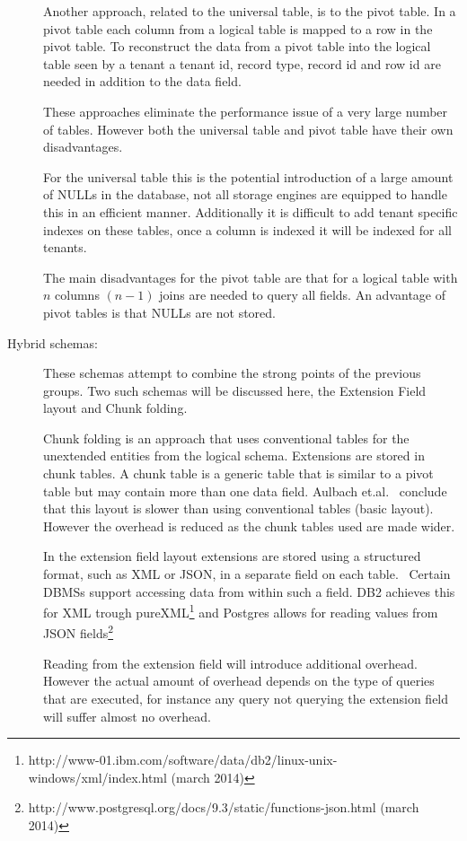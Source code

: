 \begin{description}
		Another approach, related to the universal table, is to the pivot table. 
		In a pivot table each column from a logical table is mapped to a row in the pivot table.
		To reconstruct the data from a pivot table into the logical table seen by a tenant a tenant id, record type, record id and row id are needed in addition to the data field.~\cite{aulbach2008multi}

		These approaches eliminate the performance issue of a very large number of tables.
		However both the universal table and pivot table have their own disadvantages. 

		For the universal table this is the potential introduction of a large amount of NULLs in the database, not all storage engines are equipped to handle this in an efficient manner. 
		Additionally it is difficult to add tenant specific indexes on these tables, once a column is indexed it will be indexed for all tenants.

		The main disadvantages for the pivot table are that for a logical table with $n$ columns $(n-1)$ joins are needed to query all fields. 
		An advantage of pivot tables is that NULLs are not stored.
	\item[Hybrid schemas: ] These schemas attempt to combine the strong points of the previous groups. 
		Two such schemas will be discussed here, the Extension Field layout and Chunk folding.

		Chunk folding is an approach that uses conventional tables for the unextended entities from the logical schema.
		Extensions are stored in chunk tables. A chunk table is a generic table that is similar to a pivot table but may contain more than one data field.
		Aulbach et.al.~\cite{aulbach2008multi} conclude that this layout is slower than using conventional tables (basic layout). 
		However the overhead is reduced as the chunk tables used are made wider. 

		In the extension field layout extensions are stored using a structured format, such as XML or JSON, in a separate field on each table.~\cite{aulbach2009comparison}
		Certain \acp{DBMS} support accessing data from within such a field. DB2 achieves this for XML trough pureXML\footnote{http://www-01.ibm.com/software/data/db2/linux-unix-windows/xml/index.html (march 2014)} and Postgres allows for reading values from JSON fields\footnote{http://www.postgresql.org/docs/9.3/static/functions-json.html (march 2014)}
		
		Reading from the extension field will introduce additional overhead. However the actual amount of overhead depends on the type of queries that are executed, for instance any query not querying the extension field will suffer almost no overhead.~\cite{aulbach2009comparison}
\end{description}

